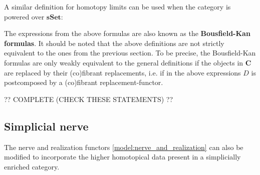     A similar definition for homotopy limits can be used when the category is powered over $\mathbf{sSet}$:
    \begin{remark}
        The expressions from the above formulas are also known as the \textbf{Bousfield-Kan formulas}. It should be noted that the above definitions are not strictly equivalent to the ones from the previous section. To be precise, the Bousfield-Kan formulas are only weakly equivalent to the general definitions if the objects in $\mathbf{C}$ are replaced by their (co)fibrant replacements, i.e. if in the above expressions $D$ is postcomposed by a (co)fibrant replacement-functor.
    \end{remark}

    ?? COMPLETE (CHECK THESE STATEMENTS) ??

\subsection{Simplicial nerve}

    The nerve and realization functors \ref{model:nerve_and_realization} can also be modified to incorporate the higher homotopical data present in a simplicially enriched category.

